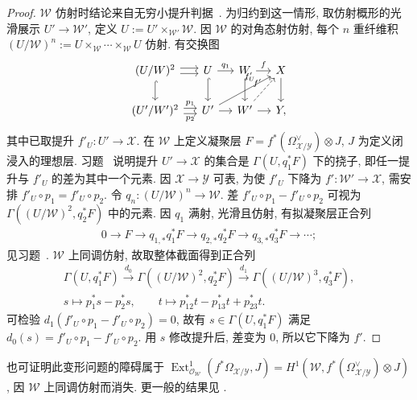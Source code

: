 \begin{proof}
$\mathcal W$ 仿射时结论来自无穷小提升判据~. 为归约到这一情形, 取仿射概形的光滑展示 $U'\to\mathcal W'$, 定义 $U:=U'\times_{\mathcal W'}\mathcal W$. 因 $\mathcal W$ 的对角态射仿射, 每个 $n$ 重纤维积 $(U/\mathcal W)^n:=U\times_{\mathcal W}\cdots\times_{\mathcal W}U$ 仿射. 有交换图
\begin{align*}
\begin{tikzcd}[ampersand replacement=\&,column sep=small]
(U/\mathcal W)^2\arrow[r,shift left]\arrow[r,shift right]\arrow[d,hook]\&U\arrow[r,"{q_1}"]\arrow[d,hook]\&\mathcal W\arrow[r,"{f}"]\arrow[d,hook]\&\mathcal X\arrow[d]\\
(U'/\mathcal W')^2\arrow[r,shift left,"{p_1}"]\arrow[r,shift right,"{p_2}"']\&U'\arrow[r]\arrow[urr,"{f'_U}",near end]\&\mathcal W'\arrow[r]\arrow[ur,dashed,"{f'}"]\&\mathcal Y,
\end{tikzcd}
\end{align*}
其中已取提升 $f'_U:U'\to\mathcal X$. 在 $\mathcal W$ 上定义凝聚层 $F=f^*(\Omega_{\mathcal X/\mathcal Y}^\vee)\otimes J$, $J$ 为定义闭浸入的理想层. 习题~ 说明提升 $U'\to\mathcal X$ 的集合是 $\Gamma(U,q_1^*F)$ 下的挠子, 即任一提升与 $f'_U$ 的差为其中一个元素. 因 $\mathcal X\to\mathcal Y$ 可表, 为使 $f'_U$ 下降为 $f':\mathcal W'\to\mathcal X$, 需安排 $f'_U\circ p_1=f'_U\circ p_2$. 令 $q_n:(U/\mathcal W)^n\to\mathcal W$. 差 $f'_U\circ p_1-f'_U\circ p_2$ 可视为 $\Gamma((U/\mathcal W)^2,q_2^*F)$ 中的元素. 因 $q_1$ 满射, 光滑且仿射, 有拟凝聚层正合列
\begin{align*}
0\to F\to q_{1,*}q_1^*F\to q_{2,*}q_2^*F\to q_{3,*}q_3^*F\to\cdots;
\end{align*}
见习题~. $\mathcal W$ 上同调仿射, 故取整体截面得到正合列
\begin{align*}
\Gamma(U,q_1^*F)\xrightarrow{d_0}\Gamma((U/\mathcal W)^2,q_2^*F)\xrightarrow{d_1}\Gamma((U/\mathcal W)^3,q_3^*F),\\
s\longmapsto p_1^*s-p_2^*s,\qquad t\longmapsto p_{12}^*t-p_{13}^*t+p_{23}^*t.
\end{align*}
可检验 $d_1(f'_U\circ p_1-f'_U\circ p_2)=0$, 故有 $s\in\Gamma(U,q_1^*F)$ 满足 $d_0(s)=f'_U\circ p_1-f'_U\circ p_2$. 用 $s$ 修改提升后, 差变为 $0$, 所以它下降为 $f'$.
\end{proof}
\begin{remark}\label{src:7.7.13}
也可证明此变形问题的障碍属于 $\operatorname{Ext}^1_{\mathcal O_{\mathcal W}}(f^*\Omega_{\mathcal X/\mathcal Y},J)=H^1(\mathcal W,f^*(\Omega_{\mathcal X/\mathcal Y}^\vee)\otimes J)$, 因 $\mathcal W$ 上同调仿射而消失. 更一般的结果见 \cite[定理 1.5]{Ols06}.
\end{remark}
